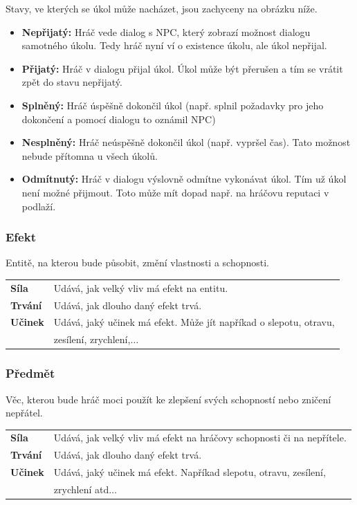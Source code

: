 \documentclass[12pt,a4paper]{article}
\begin{document}
\bigskip
\noindent
Stavy, ve kterých se úkol může nacházet, jsou zachyceny na obrázku níže.
\begin {itemize}
\item{\textbf{Nepřijatý:} Hráč vede dialog s NPC, který zobrazí možnost dialogu
  samotného úkolu. Tedy hráč nyní ví o existence úkolu, ale úkol nepřijal.}
\item{\textbf{Přijatý:} Hráč v dialogu přijal úkol. Úkol může být přerušen a tím
  se vrátit zpět do stavu nepřijatý.}
\item{\textbf{Splněný:} Hráč úspěšně dokončil úkol (např. splnil požadavky pro
  jeho dokončení a pomocí dialogu to oznámil NPC)}
\item{\textbf{Nesplněný:} Hráč neúspěšně dokončil úkol (např. vypršel čas). Tato
  možnost nebude přítomna u všech úkolů.}
\item{\textbf{Odmítnutý:} Hráč v dialogu výslovně odmítne vykonávat úkol. Tím už
  úkol není možné přijmout. Toto může mít dopad např. na hráčovu reputaci v
  podlaží.}
\end {itemize}

\subsubsection{Efekt}
Entitě, na kterou bude působit, změní vlastnosti a schopnosti. \\[5pt]

\begin{tabular*}{0.87\textwidth}{ll}
\bf Síla & Udává, jak velký vliv má efekt na entitu.\\[7pt]
\bf Trvání & Udává, jak dlouho daný efekt trvá.\\[7pt]
\bf Učinek & Udává, jaký učinek má efekt. Může jít napříkad o slepotu, otravu,\\
           & zesílení, zrychlení,$\ldots$\\[7pt]
\end{tabular*}

\subsubsection{Předmět}
Věc, kterou bude hráč moci použít ke zlepšení svých schopností nebo zničení
nepřátel.\\[5pt]

\begin{tabular*}{0.87\textwidth}{ll}
  \bf Síla & Udává, jak velký vliv má efekt na hráčovy schopnosti či na
  nepřítele. \\[7pt]
  \bf Trvání & Udává, jak dlouho daný efekt trvá. \\[7pt]
  \bf Učinek & Udává, jaký učinek má efekt. Napříkad slepotu, otravu, zesílení,\\
             & zrychlení atd$\ldots$ \\[7pt]
\end{tabular*}
\end{document}
